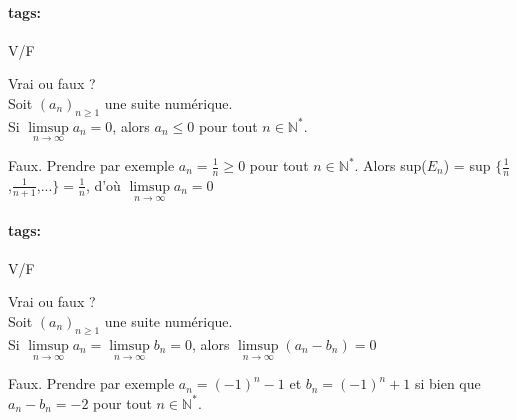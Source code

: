 \documentclass[12pt]{article}
\newcommand*{\xfield}[1]{\begin{mdframed}\centering #1\end{mdframed}\bigskip}
\newenvironment{note}{}{}
\newcommand*{\tags}[1]{\paragraph{tags: }#1}
\begin{document}
\begin{note}
\tags{V/F}
	\xfield{Vrai ou faux ?\\
	Soit $(a_n)_{n\ge 1}$ une suite numérique.\\
	Si $\limsup\limits_{n \to \infty}a_n = 0$, alors $a_n \le 0$ pour tout $n \in \mathbb{N}^*$.}
	\xfield{Faux. Prendre par exemple $a_n = \frac{1}{n} \ge 0$ pour tout $n \in \mathbb{N}^*$. Alors sup($E_n$) = sup $\{\frac{1}{n}$,$\frac{1}{n+1}$,...$\} = \frac{1}{n}$, d'où $\limsup\limits_{n \to \infty} a_n = 0$}
\end{note}

\begin{note}
\tags{V/F}
	\xfield{Vrai ou faux ?\\
	Soit $(a_n)_{n\ge 1}$ une suite numérique.\\
	Si $\limsup\limits_{n \to \infty}a_n = \limsup\limits_{n \to \infty}b_n =0$, alors $\limsup\limits_{n \to \infty}(a_n-b_n) = 0$}
	\xfield{Faux. Prendre par exemple $a_n = (-1)^n -1$ et $b_n = (-1)^n + 1$ si bien que $a_n - b_n = -2$ pour tout $n \in \mathbb{N}^*$.}
\end{note}
\end{document}
